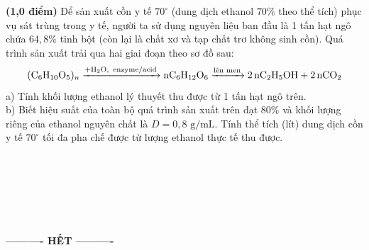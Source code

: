 \documentclass[11pt,a4paper]{article}
\begin{document}
\begin{ex}
\textbf{(1,0 điểm)} Để sản xuất cồn y tế $70^\circ$ (dung dịch ethanol $70\%$ theo thể tích) phục vụ sát trùng trong y tế, người ta sử dụng nguyên liệu ban đầu là 1 tấn hạt ngô chứa $64{,}8\%$ tinh bột (còn lại là chất xơ và tạp chất trơ không sinh cồn). Quá trình sản xuất trải qua hai giai đoạn theo sơ đồ sau:
\[ \ce{(C6H10O5)_n ->[+\ce{H2O},\, \text{enzyme/acid}] nC6H12O6 ->[\text{lên men}] 2nC2H5OH + 2nCO2} \]
a) Tính khối lượng ethanol lý thuyết thu được từ 1 tấn hạt ngô trên.\\
b) Biết hiệu suất của toàn bộ quá trình sản xuất trên đạt $80\%$ và khối lượng riêng của ethanol nguyên chất là $D = 0{,}8\text{ g/mL}$. Tính thể tích (lít) dung dịch cồn y tế $70^\circ$ tối đa pha chế được từ lượng ethanol thực tế thu được.

\vspace{0.2cm}
\dotfill\\
\dotfill\\
\dotfill\\
\dotfill\\
\dotfill\\
\dotfill
\end{ex}
\vspace{8pt}
\begin{center}
\textbf{---------- HẾT ----------}
\end{center}
\end{document}
